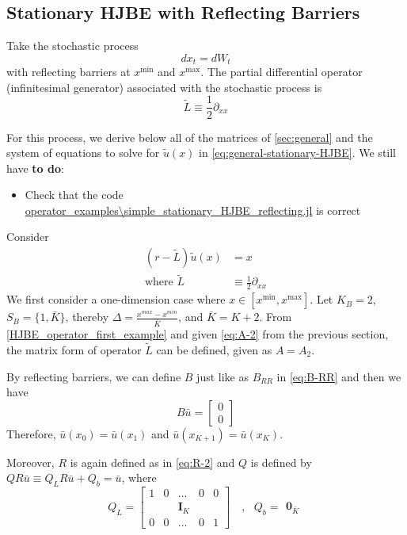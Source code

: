 \documentclass[11pt]{article}
\newcommand{\D}[1][]{\ensuremath{\partial_{#1}}}
\begin{document}
\subsection{Stationary HJBE with Reflecting Barriers}
Take the stochastic process
$$
d x_t = d W_t
$$
with reflecting barriers at $x^{\min}$ and $x^{\max}$.  The partial differential operator (infinitesimal generator) associated with the stochastic process is
$$
	\tilde{L} \equiv \frac{1}{2}\D[xx]
$$

For this process, we derive below all of the matrices of \cref{sec:general} and the system of equations to solve for $\tilde{u}(x)$ in \cref{eq:general-stationary-HJBE}. We still have \textbf{to do}:
\begin{itemize}
	\item Check that the code \url{operator_examples\simple_stationary_HJBE_reflecting.jl} is correct
\end{itemize}
Consider
\begin{align}
(r - \tilde{L} )\tilde{u}(x) &= x\label{HJBE_reflecting_barriers_PDE}\\
\text{where }\tilde{L}&\equiv \frac{1}{2}\partial_{xx}\label{HJBE_operator_first_example}
\end{align}
We first consider a one-dimension case where $x\in [x^{\min},x^{\max}]$. Let $K_B = 2$, $S_B = \{1,\bar{K}\}$, thereby $\Delta  = \frac{x^{max}-x^{min}}{\bar{K}}$, and $\bar{K} = K+2$. From \eqref{HJBE_operator_first_example} and given \eqref{eq:A-2} from the previous section, the matrix form of operator $\tilde{L}$ can be defined, given as $A = A_2$.

By reflecting barriers, we can define $B$ just like as $B_{RR}$ in \eqref{eq:B-RR} and then we have
\begin{equation}
B\bar{u} = \begin{bmatrix}
0\\
0
\end{bmatrix}
\end{equation}
Therefore, $\bar{u}(x_0) = \bar{u}(x_1)$ and $\bar{u}(x_{K+1}) = \bar{u}(x_K)$.

Moreover, $R$ is again defined as in \eqref{eq:R-2} and $Q$ is defined by $Q R\bar{u}\equiv Q_L R\bar{u}+Q_b = \bar{u}$, where
\begin{equation}
Q_L = \begin{bmatrix}
1& 0&\dots&0&0\\
 & & \mathbf{I}_K & & \\
0&0&\dots&0&1
\end{bmatrix}%
\quad , \text{ } Q_b = \begin{matrix}
\mathbf{0}_{\bar{K}}
\end{matrix}%
\end{equation}
\end{document}
